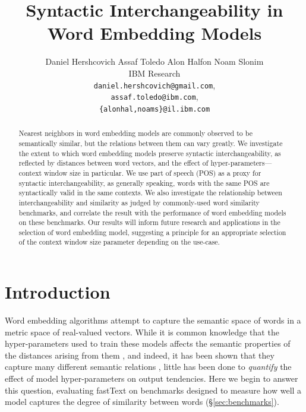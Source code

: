 \documentclass[11pt,a4paper]{article}
\title{Syntactic Interchangeability in Word Embedding Models}
\author{
Daniel Hershcovich \qquad Assaf Toledo \qquad Alon Halfon \qquad Noam Slonim \\
IBM Research\\
\texttt{daniel.hershcovich@gmail.com},\\
\texttt{assaf.toledo@ibm.com},\\
\texttt{\{alonhal,noams\}@il.ibm.com}
}
\begin{document}
    \maketitle
    
\setlength{\abovecaptionskip}{16pt}
\def\arraystretch{1.7}

    \begin{abstract}
    Nearest neighbors in word embedding models are commonly observed to be
    semantically similar, but the relations between them can vary greatly.
    We investigate the extent to which word embedding models
    preserve syntactic interchangeability, as reflected by distances between
    word vectors, and the effect of hyper-parameters---context window size in particular.
    We use part of speech (POS) as a proxy for syntactic interchangeability,
    as generally speaking, words with the same POS are syntactically valid in the same contexts.
    We also investigate the relationship between interchangeability
    and similarity as judged by commonly-used word similarity benchmarks,
    and correlate the result with the performance of word embedding models
    on these benchmarks.
    Our results will inform future research and applications in the selection
    of word embedding model, suggesting a principle for an appropriate selection
    of the context window size parameter depending on the use-case.
    \end{abstract}

    \section{Introduction}\label{sec:introduction}

    Word embedding algorithms \cite{mikolov2013efficient,pennington2014glove,levy2015improving}
    attempt to capture the semantic space of words
    in a metric space of real-valued vectors.
    While it is common knowledge that the hyper-parameters used to train these
    models affects the semantic properties of the distances arising from them
    \cite{bansal2014tailoring,lin2015unsupervised,goldberg2016primer,W17-0239},
    and indeed, it has been shown that
    they capture many different semantic relations \cite{yang2006verb,agirre2009study},
    little has been done to \textit{quantify} the
    effect of model hyper-parameters on output tendencies.
    Here we begin to answer this question,
    evaluating fastText \cite{bojanowski2016enriching}
    on benchmarks designed to measure how well a model
    captures the degree of similarity between words (\S\ref{sec:benchmarks}).
    
\end{document}
